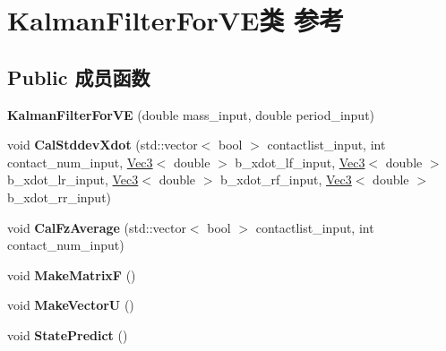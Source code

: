 \hypertarget{classKalmanFilterForVE}{}\section{Kalman\+Filter\+For\+V\+E类 参考}
\label{classKalmanFilterForVE}
\subsection*{Public 成员函数}
\begin{DoxyCompactItemize}
\item 
\mbox{\label{classKalmanFilterForVE_a483a5fbe53a03b1ac833276073c5c5e3}} 
{\bfseries Kalman\+Filter\+For\+VE} (double mass\+\_\+input, double period\+\_\+input)
\item 
\mbox{\label{classKalmanFilterForVE_a7e07280c92f48046446b5631704b635e}} 
void {\bfseries Cal\+Stddev\+Xdot} (std\+::vector$<$ bool $>$ contactlist\+\_\+input, int contact\+\_\+num\+\_\+input, \hyperlink{cppTypes_8h_a65c27bf97693676535dd0b30ea0ad399}{Vec3}$<$ double $>$ b\+\_\+xdot\+\_\+lf\+\_\+input, \hyperlink{cppTypes_8h_a65c27bf97693676535dd0b30ea0ad399}{Vec3}$<$ double $>$ b\+\_\+xdot\+\_\+lr\+\_\+input, \hyperlink{cppTypes_8h_a65c27bf97693676535dd0b30ea0ad399}{Vec3}$<$ double $>$ b\+\_\+xdot\+\_\+rf\+\_\+input, \hyperlink{cppTypes_8h_a65c27bf97693676535dd0b30ea0ad399}{Vec3}$<$ double $>$ b\+\_\+xdot\+\_\+rr\+\_\+input)
\item 
\mbox{\label{classKalmanFilterForVE_a267337aec97d41f3c722aac5d14b09b4}} 
void {\bfseries Cal\+Fz\+Average} (std\+::vector$<$ bool $>$ contactlist\+\_\+input, int contact\+\_\+num\+\_\+input)
\item 
\mbox{\label{classKalmanFilterForVE_abd2df23b17b1284474afad42cfa137eb}} 
void {\bfseries Make\+MatrixF} ()
\item 
\mbox{\label{classKalmanFilterForVE_a7524faa6cd36f64edd3ff16d6da21851}} 
void {\bfseries Make\+VectorU} ()
\item 
\mbox{\label{classKalmanFilterForVE_af5a75eae96ecc2216c73391c6d1bc51d}} 
void {\bfseries State\+Predict} ()
\item 

\end{DoxyCompactItemize}
